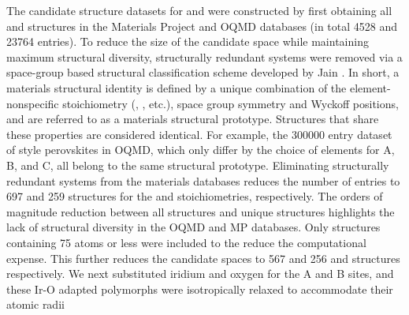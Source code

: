 %
%
The candidate structure datasets for \IrOtwo and \IrOthree were constructed by first obtaining all \ABtwo and \ABthree structures in the Materials Project\cite{Jain2013} and OQMD\cite{Kirklin2015} databases
(in total \num{4528} \ABtwo and \num{23764} \ABthree entries).
%
To reduce the size of the candidate space while maintaining maximum structural diversity, structurally redundant systems were removed via a space-group based structural classification scheme developed by Jain  \cite{Jain2018}.
%
In short, a materials structural identity is defined by a unique combination of the element-nonspecific stoichiometry (\ABtwo, \ABthree, etc.), space group symmetry and Wyckoff positions, and are referred to as a materials structural prototype.
%
Structures that share these properties are considered identical.
%
For example, the \num{300000} entry dataset of \ABOthree style perovskites in OQMD, which only differ by the choice of elements for A, B, and C, all belong to the same structural prototype.
%
Eliminating structurally redundant systems from the materials databases reduces the number of entries to \num{697} and \num{259} structures for the \ABtwo and \ABthree stoichiometries, respectively.
%
The orders of magnitude reduction between all structures and unique structures highlights the lack of structural diversity in the OQMD and MP databases.
%
Only structures containing 75 atoms or less were included to the reduce the computational expense.
%
This further reduces the candidate spaces to \num{567} and \num{256} \ABtwo and \ABthree structures respectively.
%
We next substituted iridium and oxygen for the A and B sites, and these Ir-O adapted polymorphs were isotropically relaxed to accommodate their atomic radii
